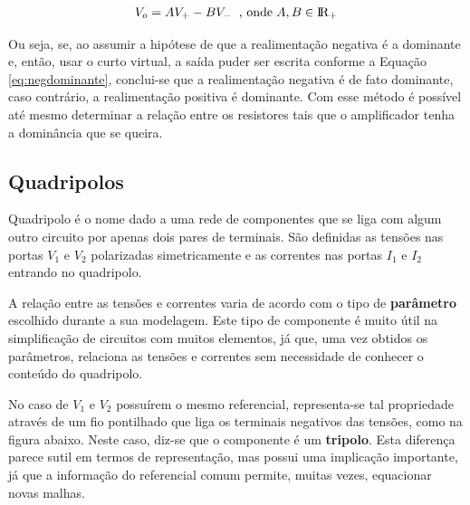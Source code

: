 \documentclass{article}
\numberwithin{equation}{section}
\begin{document}
\begin{equation}
    \label{eq:negdominante}
    V_o = AV_+ - BV_- \hspace{2mm} \text{, onde}\hspace{1mm} A,B \in {\rm I\!R}_+
\end{equation}

Ou seja, se, ao assumir a hipótese de que a realimentação negativa é a dominante e, então, usar o curto virtual, a saída puder ser escrita conforme a Equação \eqref{eq:negdominante}, conclui-se que a realimentação negativa é de fato dominante, caso contrário, a realimentação positiva é dominante. Com esse método é possível até mesmo determinar a relação entre os resistores tais que o amplificador tenha a dominância que se queira.

\subsection{Quadripolos}
\label{subsec:quadripolos}
Quadripolo é o nome dado a uma rede de componentes que se liga com algum outro circuito por apenas dois pares de terminais. São definidas as tensões nas portas $V_{1}$ e $V_{2}$ polarizadas simetricamente e as correntes nas portas $I_{1}$ e $I_{2}$ entrando no quadripolo.

\begin{center}
\end{center}

A relação entre as tensões e correntes varia de acordo com o tipo de \textbf{parâmetro} escolhido durante a sua modelagem. Este tipo de componente é muito útil na simplificação de circuitos com muitos elementos, já que, uma vez obtidos os parâmetros, relaciona as tensões e correntes sem necessidade de conhecer o conteúdo do quadripolo.

No caso de $V_1$ e $V_2$ possuírem o mesmo referencial, representa-se tal propriedade através de um fio pontilhado que liga os terminais negativos das tensões, como na figura abaixo. Neste caso, diz-se que o componente é um \textbf{tripolo}. Esta diferença parece sutil em termos de representação, mas possui uma implicação importante, já que a informação do referencial comum permite, muitas vezes, equacionar novas malhas.
\end{document}
